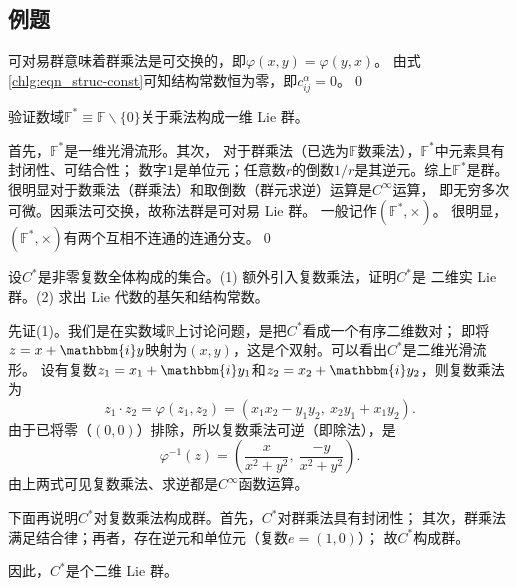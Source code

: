 \subsection{例题}
\begin{example}
可对易群意味着群乘法是可交换的，即$\varphi(x,y)=\varphi(y,x)$。
由式\eqref{chlg:eqn_struc-const}可知结构常数恒为零，即$c^\alpha_{ij}=0$。\qed
\end{example}

\begin{example}\label{chlg:exam_Ftimes}
    验证数域$\mathbb{F}^*\equiv\mathbb{F}\backslash\{0\}$关于乘法构成一维 Lie 群。
    
    首先，$\mathbb{F}^*$是一维光滑流形。其次，
    对于群乘法（已选为$\mathbb{F}$数乘法），$\mathbb{F}^*$中元素具有封闭性、可结合性；
    数字$1$是单位元；任意数$r$的倒数$1/r$是其逆元。综上$\mathbb{F}^*$是群。
    很明显对于数乘法（群乘法）和取倒数（群元求逆）运算是$C^\infty$运算，
    即无穷多次可微。因乘法可交换，故称法群是可对易 Lie 群。
    一般记作$(\mathbb{F}^*,\times)$。
    很明显，$(\mathbb{F}^*,\times)$有两个互相不连通的连通分支。\qed
\end{example}

\begin{example}\label{chlg:exam_complex}
    设$C^*$是非零复数全体构成的集合。(1) 额外引入复数乘法，证明$C^*$是
    二维实 Lie 群。(2) 求出 Lie 代数的基矢和结构常数。
\end{example}
先证(1)。我们是在实数域$\mathbb{R}$上讨论问题，是把$C^*$看成一个有序二维数对；
即将$z=x+\mathbbm{i} y$映射为$(x,y)$，这是个双射。可以看出$C^*$是二维光滑流形。
设有复数$z_1=x_1+\mathbbm{i} y_1$和$z_2=x_2+\mathbbm{i} y_2$，则复数乘法为
\begin{equation}\label{chlg:eqn_z1z2}
    z_1\cdot z_2 = \varphi(z_1,z_2)=(x_1 x_2-y_1 y_2,\ x_2 y_1+x_1 y_2).
\end{equation}
由于已将零（$(0,0)$）排除，所以复数乘法可逆（即除法），是
\begin{equation}\label{chlg:eqn_z-inv}
    \varphi^{-1}(z)=\left(\frac{x}{x^2+y^2},\ \frac{-y}{x^2+y^2}\right) .
\end{equation}
由上两式可见复数乘法、求逆都是$C^\infty$函数运算。

下面再说明$C^*$对复数乘法构成群。首先，$C^*$对群乘法具有封闭性；
其次，群乘法满足结合律；再者，存在逆元和单位元（复数$e=(1,0)$）；
故$C^*$构成群。

因此，$C^*$是个二维 Lie 群。

